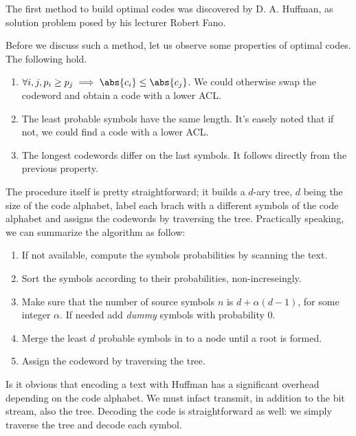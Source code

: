 \documentclass{subfiles}
\begin{document}
\label{sec:huffmanCodes}
    The first method to build optimal codes was discovered by D. A. Huffman,
        as solution problem posed by his lecturer Robert Fano\footnotemark.
        

    Before we discuss such a method, let us observe some properties of optimal codes.
        The following hold.
        \begin{enumerate}
            \item \(\forall i,j, p_{i} \ge p_{j} \implies \abs{c_{i}} \le \abs{c_{j}}\).
                We could otherwise swap the codeword and obtain a code with a lower ACL.

            \item The least probable symbols have the same length.
                It's easely noted that if not, we could find a code with a lower ACL.

            \item The longest codewords differ on the last symbols.
                It follows directly from the previous property.
        \end{enumerate}

    The procedure itself is pretty straightforward; 
        it builds a \(d\)-ary tree, \(d\) being the size of the code alphabet,
        label each brach with a different symbols of the code alphabet and 
        assigns the codewords by traversing the tree.
        Practically speaking, we can summarize the algorithm as follow:
    \begin{enumerate}
        \item If not available, compute the symbols probabilities by scanning the text.
        \item Sort the symbols according to their probabilities, non-increseingly.
        \item Make sure that the number of source symbols \(n\) is \(d + \alpha(d - 1)\),
            for some integer \(\alpha\).
            If needed add \emph{dummy} symbols with probability 0.
        \item Merge the least \(d\) probable symbols in to a node until a root is formed.
        \item Assign the codeword by traversing the tree.
    \end{enumerate}

    Is it obvious that encoding a text with Huffman has a significant overhead
        depending on the code alphabet. We must infact transmit, in addition to the 
        bit stream, also the tree. Decoding the code is straightforward as well: 
        we simply traverse the tree and decode each symbol. 
\end{document}
